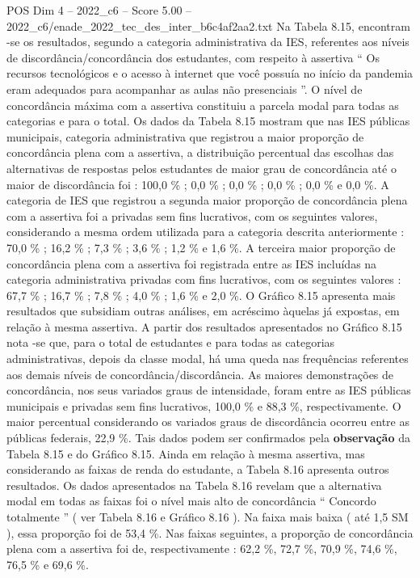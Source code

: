 \begin{textsample}{POS Dim 4 – 2022\_c6 – Score 5.00 – 2022\_c6/enade\_2022\_tec\_des\_inter\_b6c4af2aa2.txt}
Na Tabela 8.15, encontram -se os resultados, segundo a categoria administrativa da IES, referentes aos níveis de discordância/concordância dos estudantes, com respeito à assertiva “ Os recursos tecnológicos e o acesso à internet que você possuía no início da pandemia eram adequados para acompanhar as aulas não presenciais ”.
O nível de concordância máxima com a assertiva constituiu a parcela modal para todas as categorias e para o total.
Os dados da Tabela 8.15 mostram que nas IES públicas municipais, categoria administrativa que registrou a maior proporção de concordância plena com a assertiva, a distribuição percentual das escolhas das alternativas de respostas pelos estudantes de maior grau de concordância até o maior de discordância foi : 100,0 \% ; 0,0 \% ; 0,0 \% ; 0,0 \% ; 0,0 \% e 0,0 \%.
A categoria de IES que registrou a segunda maior proporção de concordância plena com a assertiva foi a privadas sem fins lucrativos, com os seguintes valores, considerando a mesma ordem utilizada para a categoria descrita anteriormente : 70,0 \% ; 16,2 \% ; 7,3 \% ; 3,6 \% ; 1,2 \% e 1,6 \%.
A terceira maior proporção de concordância plena com a assertiva foi registrada entre as IES incluídas na categoria administrativa privadas com fins lucrativos, com os seguintes valores : 67,7 \% ; 16,7 \% ; 7,8 \% ; 4,0 \% ; 1,6 \% e 2,0 \%.
O Gráfico 8.15 apresenta mais resultados que subsidiam outras análises, em acréscimo àquelas já expostas, em relação à mesma assertiva.
A partir dos resultados apresentados no Gráfico 8.15 nota -se que, para o total de estudantes e para todas as categorias administrativas, depois da classe modal, há uma queda nas frequências referentes aos demais níveis de concordância/discordância.
As maiores demonstrações de concordância, nos seus variados graus de intensidade, foram entre as IES públicas municipais e privadas sem fins lucrativos, 100,0 \% e 88,3 \%, respectivamente.
O maior percentual considerando os variados graus de discordância ocorreu entre as públicas federais, 22,9 \%.
Tais dados podem ser confirmados pela \textbf{observação} da Tabela 8.15 e do Gráfico 8.15.
Ainda em relação à mesma assertiva, mas considerando as faixas de renda do estudante, a Tabela 8.16 apresenta outros resultados.
Os dados apresentados na Tabela 8.16 revelam que a alternativa modal em todas as faixas foi o nível mais alto de concordância “ Concordo totalmente ” ( ver Tabela 8.16 e Gráfico 8.16 ).
Na faixa mais baixa ( até 1,5 SM ), essa proporção foi de 53,4 \%.
Nas faixas seguintes, a proporção de concordância plena com a assertiva foi de, respectivamente : 62,2 \%, 72,7 \%, 70,9 \%, 74,6 \%, 76,5 \% e 69,6 \%.

\end{textsample}
